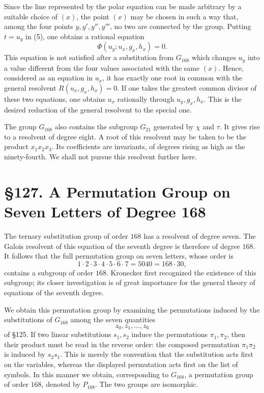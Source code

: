 \documentclass[11pt,a4paper]{book}
\newcommand{\webersection}[2]{\clearpage\section*{\S #1. #2}}
\begin{document}
Since the line represented by the polar equation can be made arbitrary by a suitable choice of \((x)\), the point \((x)\) may be chosen in such a way that, among the four points \(y,y',y'',y'''\), no two are connected by the group.  Putting \(t=u_y\) in (5), one obtains a rational equation
\begin{equation}
 \Phi(u_y;u_x,g_x,h_x)=0. \tag{6}
\end{equation}
This equation is not satisfied after a substitution from \(G_{168}\) which changes \(u_y\) into a value different from the four values associated with the same \((x)\).  Hence, considered as an equation in \(u_x\), it has exactly one root in common with the general resolvent \(R(u_x,g_x,h_x)=0\).  If one takes the greatest common divisor of these two equations, one obtains \(u_x\) rationally through \(u_y,g_x,h_x\).  This is the desired reduction of the general resolvent to the special one.

The group \(G_{168}\) also contains the subgroup \(G_{21}\) generated by \(\chi\) and \(\tau\).  It gives rise to a resolvent of degree eight.  A root of this resolvent may be taken to be the product \(x_1x_2x_3\).  Its coefficients are invariants, of degrees rising as high as the ninety-fourth.  We shall not pursue this resolvent further here.

\webersection{127}{A Permutation Group on Seven Letters of Degree 168}

The ternary substitution group of order \(168\) has a resolvent of degree seven.  The Galois resolvent of this equation of the seventh degree is therefore of degree \(168\).  It follows that the full permutation group on seven letters, whose order is
\[
 1\cdot2\cdot3\cdot4\cdot5\cdot6\cdot7=5040=168\cdot30,
\]
contains a subgroup of order \(168\).  Kronecker first recognized the existence of this subgroup; its closer investigation is of great importance for the general theory of equations of the seventh degree.

We obtain this permutation group by examining the permutations induced by the substitutions of \(G_{168}\) among the seven quantities
\[
 z_0,z_1,\ldots,z_6
\]
of \S 125.  If two linear substitutions \(s_1,s_2\) induce the permutations \(\pi_1,\pi_2\), then their product must be read in the reverse order: the composed permutation \(\pi_1\pi_2\) is induced by \(s_2s_1\).  This is merely the convention that the substitution acts first on the variables, whereas the displayed permutation acts first on the list of symbols.  In this manner we obtain, corresponding to \(G_{168}\), a permutation group of order \(168\), denoted by \(P_{168}\).  The two groups are isomorphic.
\end{document}
